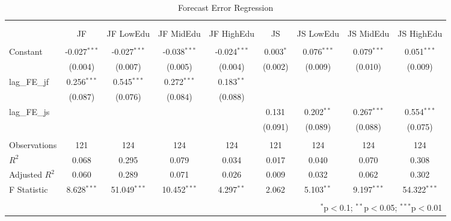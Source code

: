 \begin{table}[!htbp] \centering
  \caption{Forecast Error Regression}
  \label{tab:fe_regression}
  \begin{adjustbox}{width=\textwidth}
\begin{tabular}{@{\extracolsep{5pt}}lcccccccc}
\\[-1.8ex]\hline
\hline \\[-1.8ex]
\\[-1.8ex] & \multicolumn{1}{c}{JF} & \multicolumn{1}{c}{JF LowEdu} & \multicolumn{1}{c}{JF MidEdu} & \multicolumn{1}{c}{JF HighEdu} & \multicolumn{1}{c}{JS} & \multicolumn{1}{c}{JS LowEdu} & \multicolumn{1}{c}{JS MidEdu} & \multicolumn{1}{c}{JS HighEdu}  \\
\hline \\[-1.8ex]
 Constant & -0.027$^{***}$ & -0.027$^{***}$ & -0.038$^{***}$ & -0.024$^{***}$ & 0.003$^{*}$ & 0.076$^{***}$ & 0.079$^{***}$ & 0.051$^{***}$ \\
  & (0.004) & (0.007) & (0.005) & (0.004) & (0.002) & (0.009) & (0.010) & (0.009) \\
 lag\_FE\_jf & 0.256$^{***}$ & 0.545$^{***}$ & 0.272$^{***}$ & 0.183$^{**}$ & & & & \\
  & (0.087) & (0.076) & (0.084) & (0.088) & & & & \\
 lag\_FE\_js & & & & & 0.131$^{}$ & 0.202$^{**}$ & 0.267$^{***}$ & 0.554$^{***}$ \\
  & & & & & (0.091) & (0.089) & (0.088) & (0.075) \\
\hline \\[-1.8ex]
 Observations & 121 & 124 & 124 & 124 & 121 & 124 & 124 & 124 \\
 $R^2$ & 0.068 & 0.295 & 0.079 & 0.034 & 0.017 & 0.040 & 0.070 & 0.308 \\
 Adjusted $R^2$ & 0.060 & 0.289 & 0.071 & 0.026 & 0.009 & 0.032 & 0.062 & 0.302 \\
 F Statistic & 8.628$^{***}$  & 51.049$^{***}$  & 10.452$^{***}$  & 4.297$^{**}$  & 2.062$^{}$  & 5.103$^{**}$  & 9.197$^{***}$  & 54.322$^{***}$  \\
\hline
\hline \\[-1.8ex]
 & \multicolumn{8}{r}{$^{*}$p$<$0.1; $^{**}$p$<$0.05; $^{***}$p$<$0.01} \\
\end{tabular}
\end{adjustbox}
\end{table}